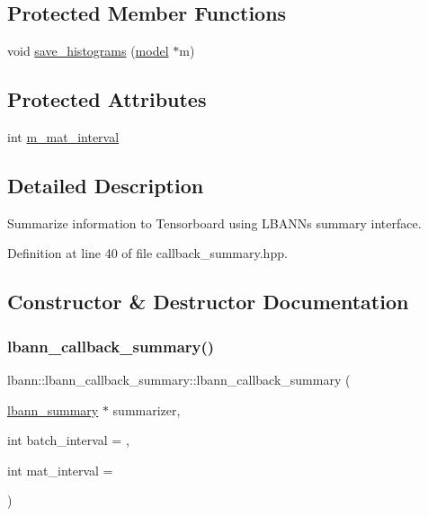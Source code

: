 \subsection*{Protected Member Functions}
\begin{DoxyCompactItemize}
\item 
void \hyperlink{classlbann_1_1lbann__callback__summary_a72a46c51527a02516584ce1e49e5cd29}{save\+\_\+histograms} (\hyperlink{classlbann_1_1model}{model} $\ast$m)
\end{DoxyCompactItemize}
\subsection*{Protected Attributes}
\begin{DoxyCompactItemize}
\item 
int \hyperlink{classlbann_1_1lbann__callback__summary_ad123c5383ce6fe1212e25021579d6e3d}{m\+\_\+mat\+\_\+interval}
\end{DoxyCompactItemize}


\subsection{Detailed Description}
Summarize information to Tensorboard using L\+B\+A\+NN\textquotesingle{}s summary interface. 

Definition at line 40 of file callback\+\_\+summary.\+hpp.



\subsection{Constructor \& Destructor Documentation}
\mbox{\label{classlbann_1_1lbann__callback__summary_aaf405a703a4047cc3c442d0a21a5d208}} 
\subsubsection{\texorpdfstring{lbann\+\_\+callback\+\_\+summary()}{lbann\_callback\_summary()}\hspace{0.1cm}{\footnotesize\ttfamily [1/2]}}
{\footnotesize\ttfamily lbann\+::lbann\+\_\+callback\+\_\+summary\+::lbann\+\_\+callback\+\_\+summary (\begin{DoxyParamCaption}\item[{\hyperlink{classlbann_1_1lbann__summary}{lbann\+\_\+summary} $\ast$}]{summarizer,  }\item[{int}]{batch\+\_\+interval = {},  }\item[{int}]{mat\+\_\+interval = {} }\end{DoxyParamCaption})}


